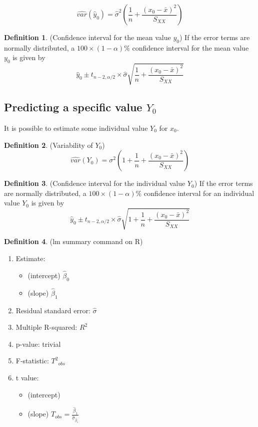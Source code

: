 \documentclass[12pt]{article}
\theoremstyle{definition}
\newtheorem{definition}{Definition}[section]
\theoremstyle{remark}
\begin{document}
    $$\hat{var}(\hat{y}_0) = \hat{\sigma}^2 \left(\frac{1}{n} + \frac{(x_0 - \bar{x})^2}{S_{XX}} \right) $$
    \begin{definition}(Confidence interval for the mean value $y_0$)
    If the error terms are normally distributed, a $100 \times(1-\alpha)\%$ confidence interval for 
    the mean value $y_0$ is given by 
    $$\hat{y}_0 \pm t_{n-2, \alpha/2} \times \hat{\sigma} \sqrt{\frac{1}{n} + \frac{(x_0-\bar{x})^2}{S_{XX}}}$$
    \end{definition}
\subsection{Predicting a specific value $Y_0$}
    It is possible to estimate some individual value $Y_0$ for $x_0$. 
    \begin{definition}(Variability of $Y_0$)
        $$\hat{var}(Y_0) = \sigma^2 \left(1+\frac{1}{n} + \frac{(x_0 - \bar{x})^2}{S_{XX}} \right) $$
        
    \end{definition}

    \begin{definition}(Confidence interval for the individual value $Y_0$)
        If the error terms are normally distributed, a $100 \times(1-\alpha)\%$ confidence interval for 
        an individual value $Y_0$ is given by 
        $$\hat{y}_0 \pm t_{n-2, \alpha/2} \times \hat{\sigma} \sqrt{1+\frac{1}{n} + \frac{(x_0-\bar{x})^2}{S_{XX}}}$$
    \end{definition}
    \begin{definition}(lm summary command on R)
        \begin{enumerate}
            \item Estimate:
            \begin{itemize}
                \item (intercept) $\hat{\beta}_0$
                \item (slope) $\hat{\beta}_1$
            \end{itemize}
            \item Residual standard error: $\hat{\sigma}$
            \item Multiple R-squared: $R^2$
            \item p-value: trivial 
            \item F-statistic: ${T^2}_{obs}$
            \item t value: 
            \begin{itemize}
                \item (intercept)
                \item (slope) $T_{obs}=\frac{\hat{\beta}_1}{\hat{\sigma}_{\hat{\beta}_1}}$
            \end{itemize}
        \end{enumerate}
    \end{definition}
\end{document}

